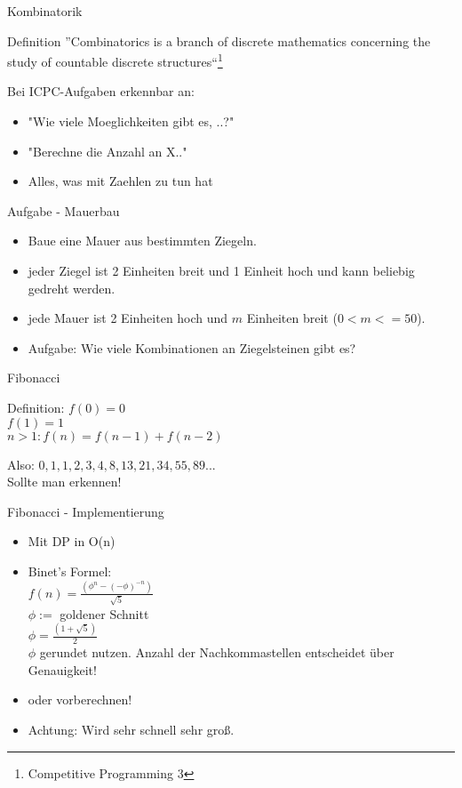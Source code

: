 \documentclass[18pt]{beamer}
\begin{document}
\begin{frame}{Kombinatorik}
\begin{block}{Definition}
	''Combinatorics is a branch of discrete mathematics concerning the study of countable discrete structures``\footnote{Competitive Programming 3}
\end{block}

Bei ICPC-Aufgaben erkennbar an:
\begin{itemize}
	\item "Wie viele Moeglichkeiten gibt es, ..?"
	\item "Berechne die Anzahl an X.."
	\item Alles, was mit Zaehlen zu tun hat
\end{itemize}
\end{frame}


\begin{frame}{Aufgabe - Mauerbau}
\begin{itemize}
	\item Baue eine Mauer aus bestimmten Ziegeln.
	\item jeder Ziegel ist 2 Einheiten breit und 1 Einheit hoch und kann beliebig gedreht werden.
	\item jede Mauer ist 2 Einheiten hoch und \(m\) Einheiten breit (\(0<m<=50\)). 
	\item Aufgabe: Wie viele Kombinationen an Ziegelsteinen gibt es?
\end{itemize}
\end{frame}


\begin{frame}{Fibonacci}
\begin{block}{Definition:}
\(f(0)=0\)\\
\(f(1)=1\)\\
\(n>1: f(n)=f(n-1)+f(n-2)\)\\
\end{block}
Also: \(0, 1, 1, 2, 3, 4, 8, 13, 21, 34, 55, 89...\)\\

Sollte man erkennen!
\end{frame}


\begin{frame}{Fibonacci - Implementierung}
\begin{itemize}
\item Mit DP in O(n)
\item Binet's Formel: \\
\(f(n) = \frac{(\phi^{n} - (-\phi)^{-n}) }{ \sqrt{5}}\)\\
\(\phi :=\)  goldener Schnitt\\
\(\phi = \frac{ (1+\sqrt{5})}{2}\)\\
\(\phi\) gerundet nutzen. Anzahl der Nachkommastellen entscheidet über Genauigkeit!

\item oder vorberechnen!\\
\item Achtung: Wird sehr schnell sehr groß.
\end{itemize}
\end{frame}
\end{document}
